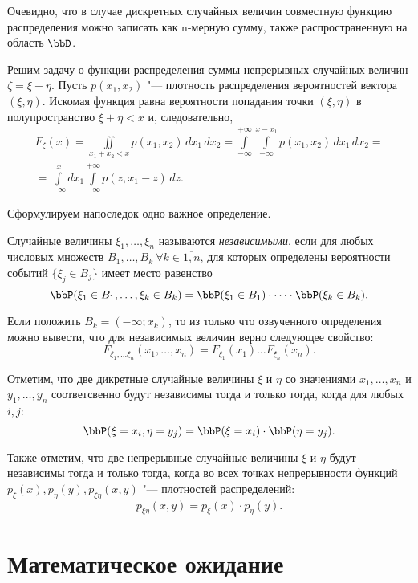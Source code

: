 Очевидно, что в случае дискретных случайных величин совместную функцию распределения можно записать как n-мерную сумму, также распространенную на область $\bbD$.


Решим задачу о функции распределения суммы непрерывных случайных величин $\zeta=\xi+\eta$. Пусть $p(x_1,x_2)$ "--- плотность распределения вероятностей вектора $(\xi,\eta)$. Искомая функция равна вероятности попадания точки $(\xi,\eta)$ в полупространство $\xi+\eta<x$ и, следовательно, 
\begin{multline}\label{ch31.1eq1}
F_{\zeta}(x)=\iint\limits_{x_1+x_2<x} p(x_1,x_2)\,dx_1\, dx_2=\int\limits_{-\infty}^{+\infty}\int\limits_{-\infty}^{x-x_1}p(x_1,x_2)\,dx_1\, dx_2=\\
=\int\limits_{-\infty}^{x}dx_1\int\limits_{-\infty}^{+\infty} p(z,x_1-z)\,dz.
\end{multline}

Сформулируем напоследок одно важное определение.
\begin{defn} Случайные величины $\xi_1,\dots,\xi_n$ называются \textit{независимыми}, если для любых числовых множеств $B_1,\dots, B_k\ \forall k\in\overline{1,n}$, для которых определены вероятности событий $\{\xi_j\in B_j\}$ имеет место равенство
$$
\bbP(\xi_1\in B_1,\dots, \xi_k \in B_k)=\bbP(\xi_1\in B_1)\cdot\dots\cdot \bbP(\xi_k \in B_k).
$$
\end{defn}

Если положить $B_k=(-\infty;x_k)$, то из только что озвученного определения можно вывести, что для независимых величин верно следующее свойство:
$$
F_{\xi_1,\dots\xi_n}(x_1,\dots,x_n)=F_{\xi_1}(x_1)\dots F_{\xi_n}(x_n).
$$

Отметим, что две дикретные случайные величины $\xi$ и $\eta$ со значениями $x_1,\dots,x_n$ и $y_1,\dots,y_n$ соответсвенно будут независимы тогда и только тогда, когда для любых $i,j$:
$$
\bbP(\xi = x_i, \eta = y_j) = \bbP (\xi = x_i)\cdot \bbP(\eta=y_j).
$$

Также отметим, что две непрерывные случайные величины $\xi$ и $\eta$ будут независимы тогда и только тогда, когда во всех точках непрерывности функций $p_\xi(x),p_\eta(y),p_{\xi\eta}(x,y)$ "--- плотностей распределений:
$$
p_{\xi\eta}(x,y)=p_\xi(x)\cdot p_\eta(y).
$$ 

\section{Математическое ожидание}

